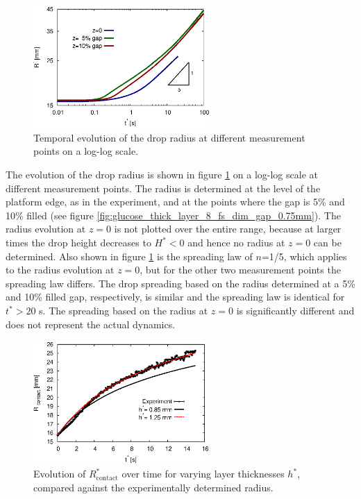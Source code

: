 \documentclass[aip,graphicx]{revtex4-1}
\newcommand{\sym}[1]{\text{#1}} \newcommand{\dif}{\mathrm{d}}
\begin{document}
\begin{figure}[!ht]
\centering
\includegraphics[width=0.6\textwidth]{figures/radius_vs_time_measure_pos_dim.eps}
\caption{Temporal evolution of the drop radius at different
  measurement points on a log-log scale.}
\label{fig:glucose_thick_layer_8_radius_vs_time_non_dim}
\end{figure}

The evolution of the drop radius is shown in figure
\ref{fig:glucose_thick_layer_8_radius_vs_time_non_dim} on a log-log
scale at different measurement points.  The radius is determined at
the level of the platform edge, as in the experiment, and at the
points where the gap is 5\% and 10\% filled (see figure
\ref{fig:glucose_thick_layer_8_fs_dim_gap_0.75mm}).  The radius
evolution at $z=0$ is not plotted over the entire range, because at
larger times the drop height decreases to $H^* < 0$ and hence no
radius at $z=0$ can be determined.  Also shown in figure
\ref{fig:glucose_thick_layer_8_radius_vs_time_non_dim} is the
spreading law of $n$=1/5, which applies to the radius evolution at
$z=0$, but for the other two measurement points the spreading law
differs.  The drop spreading based on the radius determined at a 5\%
and 10\% filled gap, respectively, is similar and the spreading law is
identical for $t^*>20$ s.  The spreading based on the radius at $z=0$
is significantly different and does not represent the actual dynamics.

\begin{figure}[!ht]
\centering
\includegraphics[width=0.6\textwidth]{figures/glucose_thick_layer_8_radius_vs_time_vary_layer.eps}
\caption{Evolution of $R^*_{\sym{contact}}$ over time for varying
  layer thicknesses $h^*$, compared against the experimentally
  determined radius.}
\label{fig:glucose_thick_layer_8_radius_vs_time_vary_layer}
\end{figure}
\end{document}
